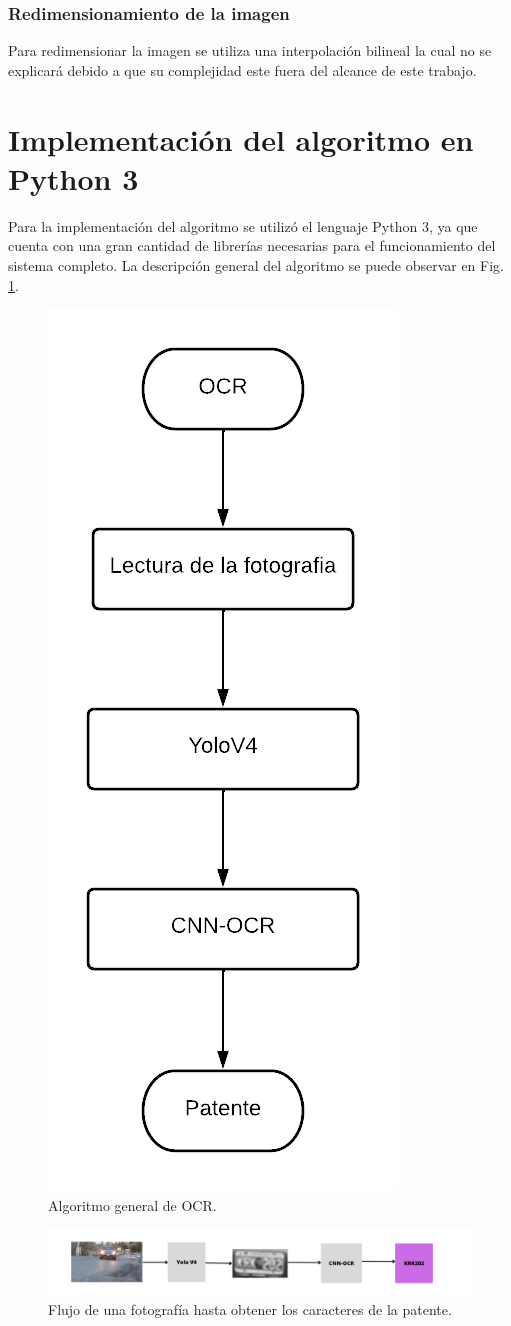 \subsubsection{Redimensionamiento de la imagen}

Para redimensionar la imagen se utiliza una interpolación bilineal la cual no se explicará debido a que su complejidad este fuera del alcance de este trabajo.

\section{Implementación del algoritmo en Python 3}

Para la implementación del algoritmo se utilizó el lenguaje Python 3, ya que cuenta con una gran cantidad de librerías necesarias para el funcionamiento del sistema completo. La descripción general del algoritmo se puede observar en Fig. \ref{fig:algoritmo-ocr}.

\begin{figure}[bth]
    \centering
    \includegraphics[width=.25\textwidth]{imgs/flujo-algoritmo-ocr.png}
    \caption{Algoritmo general de OCR.}
    \label{fig:algoritmo-ocr}
\end{figure}


\begin{figure}[bth]
    \centering
    \includegraphics[width=\textwidth]{imgs/pic-to-text.png}
    \caption{Flujo de una fotografía hasta obtener los caracteres de la patente.}
    \label{fig:pic-to-text}
\end{figure}

